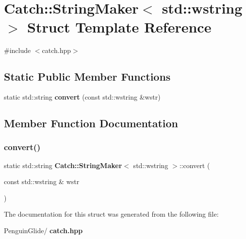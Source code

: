 \section{Catch\+::String\+Maker$<$ std\+::wstring $>$ Struct Template Reference}
\label{struct_catch_1_1_string_maker_3_01std_1_1wstring_01_4}


{\ttfamily \#include $<$catch.\+hpp$>$}

\subsection*{Static Public Member Functions}
\begin{DoxyCompactItemize}
\item 
static std\+::string \textbf{ convert} (const std\+::wstring \&wstr)
\end{DoxyCompactItemize}


\subsection{Member Function Documentation}
\mbox{\label{struct_catch_1_1_string_maker_3_01std_1_1wstring_01_4_a375d49d6281bee4d36d853fa1bd5ebbd}} 
\subsubsection{convert()}
{\footnotesize\ttfamily static std\+::string \textbf{ Catch\+::\+String\+Maker}$<$ std\+::wstring $>$\+::convert (\begin{DoxyParamCaption}\item[{const std\+::wstring \&}]{wstr }\end{DoxyParamCaption})\hspace{0.3cm}{\ttfamily [static]}}



The documentation for this struct was generated from the following file\+:\begin{DoxyCompactItemize}
\item 
Penguin\+Glide/\textbf{ catch.\+hpp}\end{DoxyCompactItemize}
